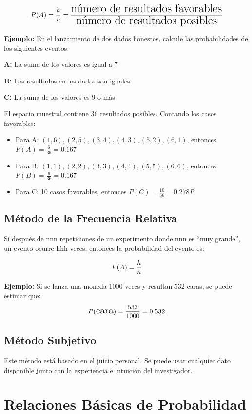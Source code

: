 \documentclass[
  spanish,
  letterpaper,
]{book}
\begin{document}
\[\LARGE P(A) = \frac{h}{n} = \frac{\text{número de resultados favorables}}{\text{número de resultados posibles}}\]

\textbf{Ejemplo:} En el lanzamiento de dos dados honestos, calcule las
probabilidades de los siguientes eventos:

\textbf{A:} La suma de los valores es igual a 7

\textbf{B:} Los resultados en los dados son iguales

\textbf{C:} La suma de los valores es 9 o más

El espacio muestral contiene 36 resultados posibles. Contando los casos
favorables:

\begin{itemize}
\item
  Para A: \({(1,6),(2,5),(3,4),(4,3),(5,2),(6,1)}\), entonces
  \(P(A) = \frac{6}{36} = 0.167\)
\item
  Para B: \({(1,1), (2,2), (3,3), (4,4), (5,5), (6,6)}\), entonces
  \(P(B) = \frac{6}{36} = 0.167\)
\item
  Para C: 10 casos favorables, entonces
  \(P(C) = \frac{10}{36} = 0.278P\)
\end{itemize}

\subsection{Método de la Frecuencia
Relativa}\label{muxe9todo-de-la-frecuencia-relativa}

Si después de nnn repeticiones de un experimento donde nnn es ``muy
grande'', un evento ocurre hhh veces, entonces la probabilidad del
evento es:

\[\huge P(A) = \frac{h}{n}\]

\textbf{Ejemplo:} Si se lanza una moneda 1000 veces y resultan 532
caras, se puede estimar que:
\[\Large P(\text{cara}) = \frac{532}{1000} = 0.532\]

\subsection{Método Subjetivo}\label{muxe9todo-subjetivo}

Este método está basado en el juicio personal. Se puede usar cualquier
dato disponible junto con la experiencia e intuición del investigador.

\section{Relaciones Básicas de
Probabilidad}\label{relaciones-buxe1sicas-de-probabilidad}
\end{document}
